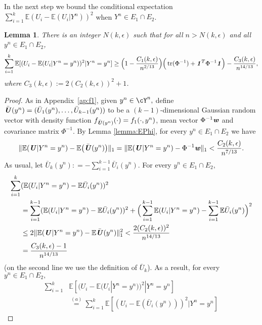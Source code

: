 \documentclass[11pt,onecolumn]{IEEEtran}
\newtheorem{lemma}[theorem]{Lemma}
\def\mathbi#1{{\textbf{\textit #1}}}
\DeclareMathOperator{\tr}{tr}
\begin{document}
\vspace*{.1in} In the next step we bound the conditional expectation $\sum_{i=1}^k \mathbb{E}  (U_i- \mathbb{E} (U_i | Y^n ) )^2$ when $Y^n\in E_1\cap E_2$. 

\begin{lemma}
 There is an integer $N(k,\epsilon)$ such that for all $n>N(k,\epsilon)$ and all
$y^n \in E_1\cap E_2$,
  \begin{equation}\label{eq:osa}
\sum_{i=1}^k \mathbb{E} [ (U_i- \mathbb{E} (U_i | Y^n=y^n ) )^2 | Y^n=y^n]\ge\Big(1 - \frac{C_1(k,\epsilon)}{n^{2/13} } \Big) 
\Big( \tr(\Phi^{-1}) + \mathbi{1}^T \Phi^{-1} \mathbi{1} \Big) 
  -  \frac{C_3(k,\epsilon)}{n^{14/13}},
  \end{equation}
  where $C_3(k,\epsilon) := 2(C_2(k,\epsilon))^2+1$.
\end{lemma}
\begin{proof}
As in Appendix~\ref{ap:f1}, given $y^n\in \cY^n,$ define $\bar{\mathbi{U}}(y^n)=(\bar{U}_1(y^n),\dots,\bar{U}_{k-1}(y^n)) $ to be
a $(k-1)$-dimensional Gaussian random vector with density function $f_{\bar{\mathbi{U}}(y^n)}(\cdot)=  f_1(\cdot,y^n)$, mean vector $\Phi^{-1}\mathbi{w}$ and covariance matrix $\Phi^{-1}.$
By Lemma \ref{lemma:EPhi}, for every $y^n \in E_1\cap E_2$ we have
$$
 \| \mathbb{E}(\mathbi{U}|Y^n=y^n) - \mathbb{E}\big( \bar{\mathbi{U}}(y^n) \big) \|_1 =
 \| \mathbb{E}(\mathbi{U}|Y^n=y^n) - \Phi^{-1}\mathbi{w}\|_1 
< \frac{C_2(k,\epsilon)}{n^{7/13}}.
$$
As usual, let $\bar{U}_k(y^n): = -\sum_{i=1}^{k-1} \bar{U}_i(y^n)$. For every $y^n \in E_1\cap E_2,$
\begin{align*}
\sum_{i=1}^k &( \mathbb{E}(U_i|Y^n=y^n) - \mathbb{E} \bar{U}_i(y^n)  )^2 \\
& =  \sum_{i=1}^{k-1} ( \mathbb{E}(U_i|Y^n=y^n) - \mathbb{E} \bar{U}_i(y^n)  )^2
+  \Big(\sum_{i=1}^{k-1} \mathbb{E}(U_i|Y^n=y^n) - 
\sum_{i=1}^{k-1}\mathbb{E} \bar{U}_i(y^n)  \Big)^2 \\
& \le  2  \| \mathbb{E}(\mathbi{U}|Y^n=y^n) - \mathbb{E} \bar{\mathbi{U}}(y^n) \|_1 ^2
< \frac{2(C_2(k,\epsilon))^2}{n^{14/13}}\\
& = \frac{C_3(k,\epsilon) - 1}{n^{14/13}}
\end{align*}
(on the second line we use the definition of $\bar U_k$).
As a result, for every $y^n \in E_1\cap E_2,$
\begin{align}
   \sum_{i=1}^k &\mathbb{E} [ (U_i - \mathbb{E} (U_i | Y^n=y^n ) )^2 | Y^n=y^n ] \nonumber\\
& \overset{(a)}{=}\sum_{i=1}^k \mathbb{E} [ (U_i- \mathbb{E}( \bar{U}_i(y^n) ) )^2 | Y^n=y^n ]

\end{align}
\end{proof}
\end{document}
